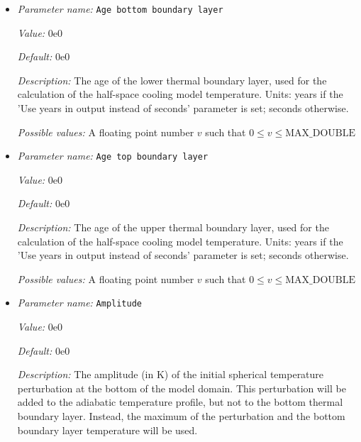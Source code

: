 \begin{itemize}
\item {\it Parameter name:} {\tt Age bottom boundary layer}
\label{parameters:Initial temperature model/Adiabatic/Age bottom boundary layer}
\label{parameters:Initial_20temperature_20model/Adiabatic/Age_20bottom_20boundary_20layer}


{\it Value:} 0e0


{\it Default:} 0e0


{\it Description:} The age of the lower thermal boundary layer, used for the calculation of the half-space cooling model temperature. Units: years if the 'Use years in output instead of seconds' parameter is set; seconds otherwise.


{\it Possible values:} A floating point number $v$ such that $0 \leq v \leq \text{MAX\_DOUBLE}$
\item {\it Parameter name:} {\tt Age top boundary layer}
\label{parameters:Initial temperature model/Adiabatic/Age top boundary layer}
\label{parameters:Initial_20temperature_20model/Adiabatic/Age_20top_20boundary_20layer}


{\it Value:} 0e0


{\it Default:} 0e0


{\it Description:} The age of the upper thermal boundary layer, used for the calculation of the half-space cooling model temperature. Units: years if the 'Use years in output instead of seconds' parameter is set; seconds otherwise.


{\it Possible values:} A floating point number $v$ such that $0 \leq v \leq \text{MAX\_DOUBLE}$
\item {\it Parameter name:} {\tt Amplitude}
\label{parameters:Initial temperature model/Adiabatic/Amplitude}
\label{parameters:Initial_20temperature_20model/Adiabatic/Amplitude}


{\it Value:} 0e0


{\it Default:} 0e0


{\it Description:} The amplitude (in K) of the initial spherical temperature perturbation at the bottom of the model domain. This perturbation will be added to the adiabatic temperature profile, but not to the bottom thermal boundary layer. Instead, the maximum of the perturbation and the bottom boundary layer temperature will be used.



\end{itemize}
